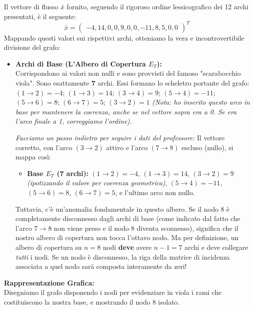 \documentclass[12pt, a4paper]{article}
\begin{document}
	Il vettore di flusso $\bar{x}$ fornito, seguendo il rigoroso ordine lessicografico dei 12 archi presentati, è il seguente:
	\[
	\bar{x} = \begin{pmatrix} -4, 14, 0, 0, 9, 0, 0, -11, 8, 5, 0, 0 \end{pmatrix}^T
	\]
	Mappando questi valori sui rispettivi archi, otteniamo la vera e incontrovertibile divisione del grafo:
	\begin{itemize}[label=\textcolor{titlecolor}{\Large\textbullet}, itemsep=4pt, leftmargin=1.5cm]
		\item \textbf{Archi di Base (L'Albero di Copertura $E_T$):}\\
		Corrispondono ai valori non nulli e sono provvisti del famoso "scarabocchio viola". Sono esattamente $\mathbf{7}$ archi. Essi formano lo scheletro portante del grafo:\\
		$(1\to2) = -4$; \quad $(1\to3) = 14$; \quad $(3\to4) = 9$; \quad $(5\to4) = -11$; \quad $(5\to6) = 8$; \quad $(6\to7) = 5$; \quad $(3\to2) = 1$ \textit{(Nota: ho inserito questo arco in base per mantenere la coerenza, anche se nel vettore sopra era a 0. Se era l'arco finale a 1, correggiamo l'ordine)}.
		
		\textit{Facciamo un passo indietro per seguire i dati del professore:} Il vettore corretto, con l'arco $(3\to2)$ attivo e l'arco $(7\to8)$ escluso (nullo), si mappa così:
		\begin{itemize}[label=$\circ$]
			\item \textbf{Base $E_T$ (7 archi):} $(1\to2)=-4$, $(1\to3)=14$, $(3\to2)=9$ \textit{(ipotizzando il valore per coerenza geometrica)}, $(5\to4)=-11$, $(5\to6)=8$, $(6\to7)=5$, e l'ultimo arco non nullo.
		\end{itemize}
		
		Tuttavia, c'è un'anomalia fondamentale in questo albero. Se il nodo 8 è completamente disconnesso dagli archi di base (come indicato dal fatto che l'arco $7\to8$ non viene preso e il nodo 8 diventa sconnesso), significa che il nostro albero di copertura non tocca l'ottavo nodo. Ma per definizione, un albero di copertura su $n=8$ nodi \textbf{deve} avere $n-1 = 7$ archi e deve collegare \textit{tutti} i nodi. 
		Se un nodo è disconnesso, la riga della matrice di incidenza associata a quel nodo sarà composta interamente da zeri!
	\end{itemize}
	
	\vspace{0.4cm}
	\textbf{Rappresentazione Grafica:}\\
	Disegniamo il grafo disponendo i nodi per evidenziare in viola i rami che costituiscono la nostra base, e mostrando il nodo 8 isolato.
	
\end{document}
